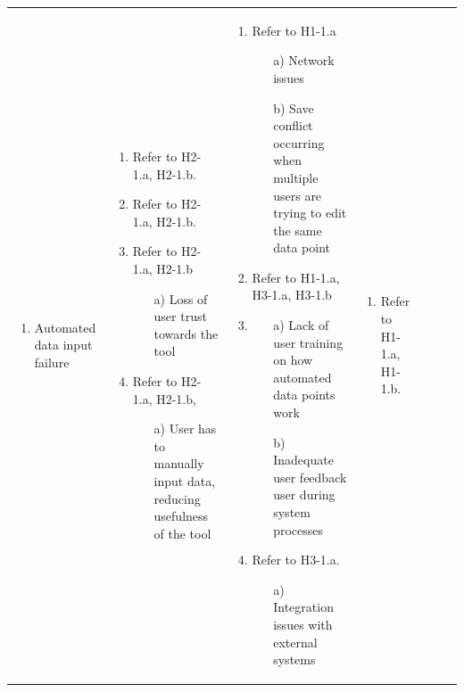 \documentclass{article}
\begin{document}
\begin{landscape}
\begin{longtable}{|p{2cm}|p{4cm}|p{4cm}|p{4cm}|p{4cm}|p{2cm}|p{2cm}|}
\begin{enumerate}[leftmargin=*]
      \item Automated data input failure
  \end{enumerate} &
  \begin{enumerate}[leftmargin=*]
      \item Refer to H2-1.a, H2-1.b.
      \item Refer to H2-1.a, H2-1.b.
      \item Refer to H2-1.a, H2-1.b
      \begin{enumerate}
        \item[a)] Loss of user trust towards the tool
    \end{enumerate}
      \item Refer to H2-1.a, H2-1.b,
      \begin{enumerate}
        \item[a)] User has to manually input data, reducing usefulness of the tool
    \end{enumerate}
  \end{enumerate} &
  \begin{enumerate}[leftmargin=*]
       \item Refer to H1-1.a
       \begin{enumerate}
            \item[a)] Network issues
            \item[b)] Save conflict occurring when multiple users are trying to edit the same data point
        \end{enumerate}
       \item Refer to H1-1.a, H3-1.a, H3-1.b
       \item
       \begin{enumerate}
            \item[a)] Lack of user training on how automated data points work
            \item[b)] Inadequate user feedback user during system processes
        \end{enumerate}
       \item Refer to H3-1.a.
       \begin{enumerate}
            \item[a)] Integration issues with external systems
        \end{enumerate}
  \end{enumerate} &
  \begin{enumerate}[leftmargin=*]
    \item Refer to H1-1.a, H1-1.b.
    \begin{enumerate}

\end{enumerate}
\end{enumerate}
\end{longtable}
\end{landscape}
\end{document}

